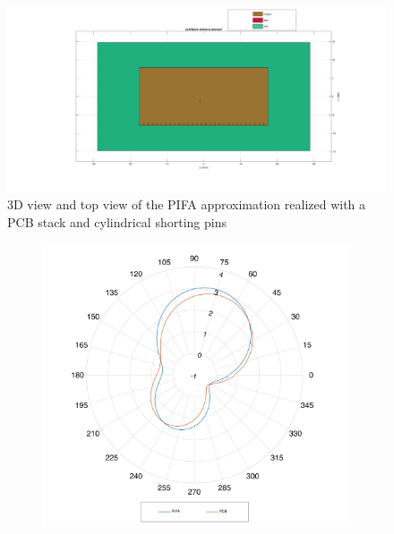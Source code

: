 \documentclass[12pt,a4paper,twocolumn]{article}
\begin{document}
{\begin{center}
\begin{figure}[h]
			\includegraphics[scale=0.2]{pcb_shorting_pins_top_view.pdf}
		\caption{3D view and top view of the PIFA approximation realized with a PCB stack and cylindrical shorting pins}
		\label{fig:pcb shorting}
	\end{figure}
\end{center}
\begin{figure}[h]
	\begin{center}
		\begin{subfigure}{0.5\linewidth}
			\includegraphics[scale=0.3]{pifa_pcb_null_azymuth_comparison.pdf}
			\caption{}
		\end{subfigure}
		\begin{subfigure}{0.5\linewidth}

\end{subfigure}
\end{center}
\end{figure}}
\end{document}
